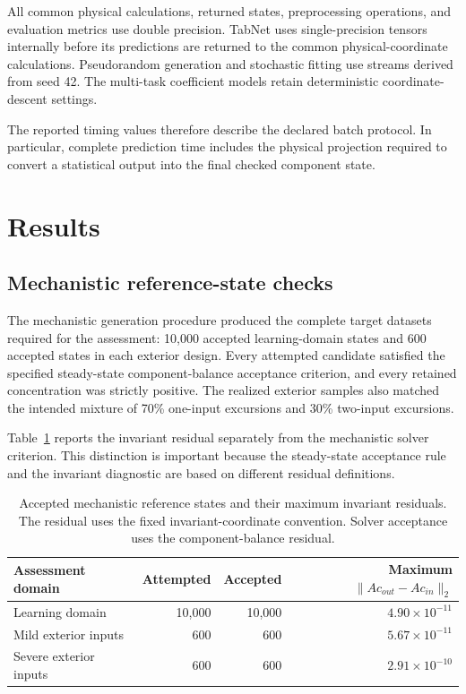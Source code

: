 All common physical calculations, returned states, preprocessing operations, and evaluation metrics use double precision. TabNet uses single-precision tensors internally before its predictions are returned to the common physical-coordinate calculations. Pseudorandom generation and stochastic fitting use streams derived from seed 42. The multi-task coefficient models retain deterministic coordinate-descent settings.

The reported timing values therefore describe the declared batch protocol. In particular, complete prediction time includes the physical projection required to convert a statistical output into the final checked component state.

\section{Results}
\label{sec:projection_results}

\subsection{Mechanistic reference-state checks}

The mechanistic generation procedure produced the complete target datasets required for the assessment: 10,000 accepted learning-domain states and 600 accepted states in each exterior design. Every attempted candidate satisfied the specified steady-state component-balance acceptance criterion, and every retained concentration was strictly positive. The realized exterior samples also matched the intended mixture of 70\% one-input excursions and 30\% two-input excursions.

Table~\ref{tab:projection_dataset_results} reports the invariant residual separately from the mechanistic solver criterion. This distinction is important because the steady-state acceptance rule and the invariant diagnostic are based on different residual definitions.

\begin{table}[htbp]
\centering\small
\caption{Accepted mechanistic reference states and their maximum invariant residuals. The residual uses the fixed invariant-coordinate convention. Solver acceptance uses the component-balance residual.}
\label{tab:projection_dataset_results}
\begin{tabular}{lrrr}
\toprule
Assessment domain & Attempted & Accepted & Maximum $\|Ac_{out}-Ac_{in}\|_2$\\
\midrule
Learning domain & 10,000 & 10,000 & $4.90\times10^{-11}$\\
Mild exterior inputs & 600 & 600 & $5.67\times10^{-11}$\\
Severe exterior inputs & 600 & 600 & $2.91\times10^{-10}$\\
\bottomrule
\end{tabular}
\end{table}

